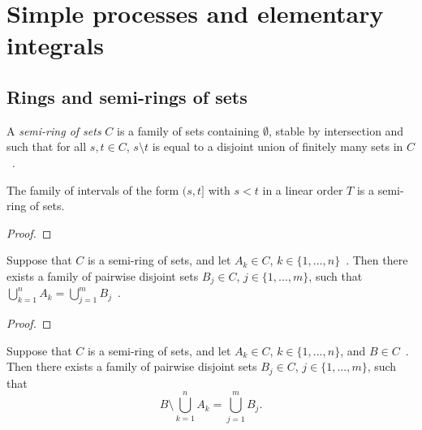 \chapter{Simple processes and elementary integrals}

\section{Rings and semi-rings of sets}

\begin{definition}\label{def:semiRingOfSets}
  \mathlibok
  A \emph{semi-ring of sets} $C$ is a family of sets containing $\emptyset$,
  stable by intersection and such that for all $s, t \in C$,
  $s \setminus t$ is equal to a disjoint union of finitely many sets in $C$~.
\end{definition}

\begin{lemma}\label{lem:semiRingOfSets_of_intervals}
  \mathlibok
  The family of intervals of the form $(s, t]$
  with $s < t$ in a linear order $T$ is a semi-ring of sets.
\end{lemma}

\begin{proof}\leanok
\end{proof}

\begin{lemma}\label{lem:semiRingOfSets_disjoint_of_union}
  \mathlibok
  Suppose that $C$ is a semi-ring of sets, and let $A_k \in C$, $k \in \{1, ..., n\}$~.
  Then there exists a family of pairwise disjoint sets $B_j \in C$, $j \in \{1, ..., m\}$,
  such that $\bigcup_{k=1}^n A_k = \bigcup_{j=1}^m B_j$~.
\end{lemma}

\begin{proof}\leanok
\end{proof}

\begin{corollary}\label{cor:semiRingOfSets_subtractUnion}
  \mathlibok
  Suppose that $C$ is a semi-ring of sets, and let
  $A_k \in C$, $k \in \{1, ..., n\}$, and $B\in C$~.
  Then there exists a family of pairwise disjoint sets $B_j \in C$, $j \in \{1, ..., m\}$,
  such that
  \[
    B\setminus\bigcup_{k=1}^n A_k = \bigcup_{j=1}^m B_j.
  \]
\end{corollary}

